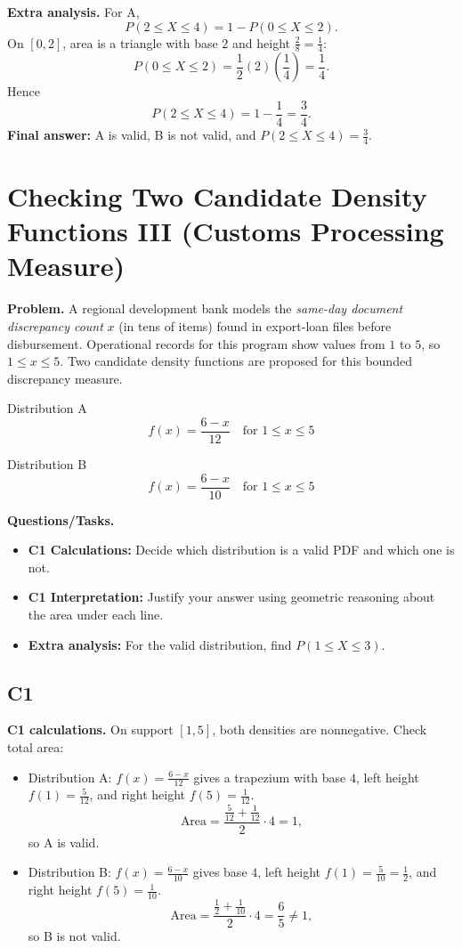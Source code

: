 \textbf{Extra analysis.}
For A,
\[
P(2\le X\le4)=1-P(0\le X\le2).
\]
On $[0,2]$, area is a triangle with base $2$ and height $\frac{2}{8}=\frac14$:
\[
P(0\le X\le2)=\frac12(2)\left(\frac14\right)=\frac14.
\]
Hence
\[
P(2\le X\le4)=1-\frac14=\frac34.
\]
\textbf{Final answer:} A is valid, B is not valid, and $P(2\le X\le4)=\frac34$.

	\section{Checking Two Candidate Density Functions III (Customs Processing Measure)}
	
	\textbf{Problem.}
	A regional development bank models the \emph{same-day document discrepancy count} $x$ (in tens of items) found in export-loan files before disbursement. Operational records for this program show values from $1$ to $5$, so $1\le x\le 5$.
	Two candidate density functions are proposed for this bounded discrepancy measure.
	
	Distribution A
	\[
	f(x)=\frac{6-x}{12}\quad\text{for }1\le x\le 5
	\]
	
	Distribution B
	\[
	f(x)=\frac{6-x}{10}\quad\text{for }1\le x\le 5
	\]
	
	\textbf{Questions/Tasks.}
	\begin{itemize}
		\item \textbf{C1 Calculations:} Decide which distribution is a valid PDF and which one is not.
		\item \textbf{C1 Interpretation:} Justify your answer using geometric reasoning about the area under each line.
		\item \textbf{Extra analysis:} For the valid distribution, find $P(1\le X\le 3)$.
	\end{itemize}
	
	\subsection*{C1}
	
	\textbf{C1 calculations.}
	On support $[1,5]$, both densities are nonnegative. Check total area:
	\begin{itemize}
		\item Distribution A: $f(x)=\frac{6-x}{12}$ gives a trapezium with base $4$, left height $f(1)=\frac{5}{12}$, and right height $f(5)=\frac{1}{12}$.
		\[
		\text{Area}=\frac{\frac{5}{12}+\frac{1}{12}}{2}\cdot 4=1,
		\]
		so A is valid.
		\item Distribution B: $f(x)=\frac{6-x}{10}$ gives base $4$, left height $f(1)=\frac{5}{10}=\frac12$, and right height $f(5)=\frac{1}{10}$.
		\[
		\text{Area}=\frac{\frac12+\frac{1}{10}}{2}\cdot 4=\frac65\ne1,
		\]
		so B is not valid.
	\end{itemize}
	
